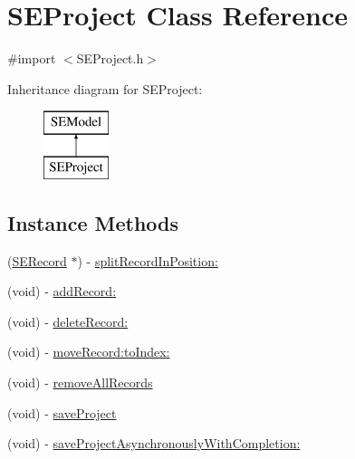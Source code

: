 \hypertarget{interface_s_e_project}{\section{S\-E\-Project Class Reference}
\label{interface_s_e_project}
}


{\ttfamily \#import $<$S\-E\-Project.\-h$>$}

Inheritance diagram for S\-E\-Project\-:\begin{figure}[H]
\begin{center}
\leavevmode
\includegraphics[height=2.000000cm]{interface_s_e_project}
\end{center}
\end{figure}
\subsection*{Instance Methods}
\begin{DoxyCompactItemize}
\item 
(\hyperlink{interface_s_e_record}{S\-E\-Record} $\ast$) -\/ \hyperlink{interface_s_e_project_adb4519610c7481bf048f235189ff737c}{split\-Record\-In\-Position\-:}
\item 
(void) -\/ \hyperlink{interface_s_e_project_a215f3b65a6214364b1c91a3e868e326f}{add\-Record\-:}
\item 
(void) -\/ \hyperlink{interface_s_e_project_a766d033976c34b25c714664a936431c0}{delete\-Record\-:}
\item 
(void) -\/ \hyperlink{interface_s_e_project_a6df677b3addadd2b57c7cb476817b3f0}{move\-Record\-:to\-Index\-:}
\item 
(void) -\/ \hyperlink{interface_s_e_project_adf1f53d931f669b12dfbabf92e3e90a4}{remove\-All\-Records}
\item 
(void) -\/ \hyperlink{interface_s_e_project_ad0dc83a89c70e8a670d2e0eb0381e632}{save\-Project}
\item 
(void) -\/ \hyperlink{interface_s_e_project_a996a39778f2d176ecf7ffda117703f6c}{save\-Project\-Asynchronously\-With\-Completion\-:}
\end{DoxyCompactItemize}
